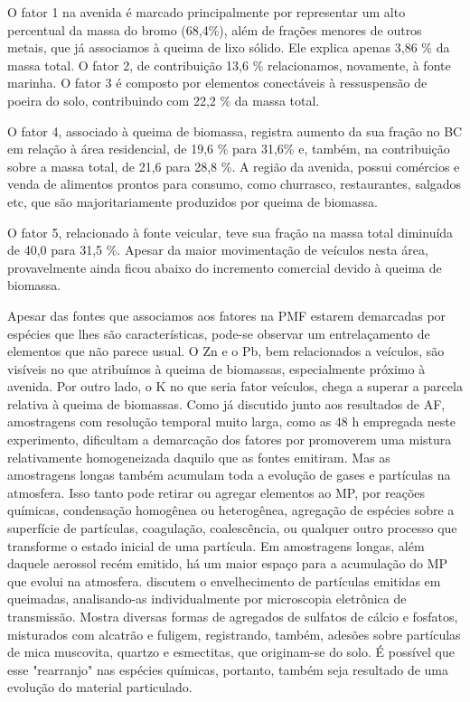 O fator 1 na avenida é marcado principalmente por representar um alto percentual 
da massa do bromo (68,4\%), além de frações menores de outros metais,
 que já associamos à queima de lixo sólido. Ele explica apenas 3,86 \% da 
massa total. O fator 2, de contribuição 13,6 \% relacionamos, novamente, 
à fonte marinha. O fator 3 é composto por elementos conectáveis à ressuspensão 
de poeira do solo, contribuindo com 22,2 \% da massa total. 

O fator 4, associado à queima de biomassa, registra aumento da sua fração no BC
em relação à área residencial, de 19,6 \% para 31,6\% e, também, na contribuição
sobre a massa total, de 21,6 para 28,8 \%. A região da avenida, possui comércios
e venda de alimentos prontos para consumo, como churrasco, restaurantes, 
salgados etc, que são majoritariamente produzidos por queima de biomassa. 

O fator 5, relacionado à fonte veicular, teve sua fração na massa total 
diminuída de 40,0 para 31,5 \%. Apesar da maior movimentação de veículos nesta 
área, provavelmente ainda ficou abaixo do incremento comercial devido à 
queima de biomassa.

Apesar das fontes que associamos aos fatores na PMF estarem demarcadas por 
espécies que lhes são características, pode-se observar um entrelaçamento de 
elementos que não parece usual. O Zn e o Pb, bem relacionados a veículos, 
são visíveis no que atribuímos à queima de biomassas, especialmente próximo à 
avenida. Por outro lado, o K no que seria fator veículos, chega a superar a 
parcela relativa à queima de biomassas.
Como já discutido junto aos resultados de AF, amostragens com resolução 
temporal muito larga, como as 48 h empregada neste experimento, dificultam a 
demarcação dos fatores por promoverem uma mistura relativamente homogeneizada 
daquilo que as fontes emitiram.
Mas as amostragens longas também acumulam toda a evolução de gases e 
partículas na atmosfera. Isso tanto pode retirar ou agregar elementos ao MP, 
por reações químicas, condensação homogênea ou heterogênea, agregação de 
espécies sobre a superfície de partículas, coagulação, coalescência, ou 
qualquer outro processo que transforme o estado inicial de uma partícula. 
Em amostragens longas, além daquele aerossol recém emitido, há um maior espaço 
para a acumulação do MP que evolui na atmosfera. 
\citet{li2003} discutem o envelhecimento de partículas emitidas em queimadas, 
analisando-as individualmente por microscopia eletrônica de transmissão. 
Mostra diversas formas de agregados de sulfatos de cálcio e fosfatos, 
misturados com alcatrão e fuligem, registrando, também, adesões sobre partículas 
de mica muscovita, quartzo e esmectitas, que originam-se do solo. É possível que
esse "rearranjo" nas espécies químicas, portanto, também seja resultado de uma 
evolução do material particulado.

